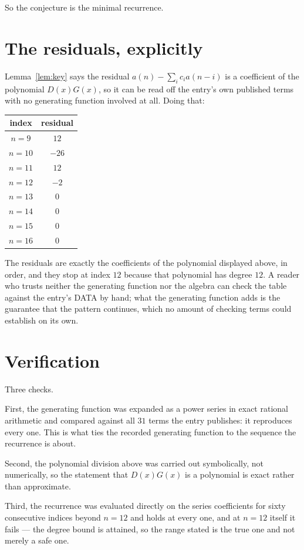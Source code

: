 \documentclass[11pt,a4paper]{article}
\theoremstyle{plain}
\theoremstyle{definition}
\begin{document}
So the conjecture is the minimal recurrence.

\section{The residuals, explicitly}

Lemma~\ref{lem:key} says the residual $a(n)-\sum_ic_ia(n-i)$ is a coefficient of the
polynomial $D(x)G(x)$, so it can be read off the entry's own published terms with no
generating function involved at all. Doing that:
\begin{center}
\begin{tabular}{cc}
index & residual \\ \hline
$n=9$ & $12$ \\
$n=10$ & $-26$ \\
$n=11$ & $12$ \\
$n=12$ & $-2$ \\
$n=13$ & $0$ \\
$n=14$ & $0$ \\
$n=15$ & $0$ \\
$n=16$ & $0$
\end{tabular}
\end{center}
The residuals are exactly the coefficients of the polynomial displayed above, in order, and
they stop at index $12$ because that polynomial has degree $12$. A reader who trusts
neither the generating function nor the algebra can check the table against the entry's DATA
by hand; what the generating function adds is the guarantee that the pattern continues, which
no amount of checking terms could establish on its own.

\section{Verification}

Three checks.

First, the generating function was expanded as a power series in exact rational arithmetic and
compared against all $31$ terms the entry publishes: it reproduces every one. This is
what ties the recorded generating function to the sequence the recurrence is about.

Second, the polynomial division above was carried out symbolically, not numerically, so the
statement that $D(x)G(x)$ is a polynomial is exact rather than approximate.

Third, the recurrence was evaluated directly on the series coefficients for sixty consecutive
indices beyond $n=12$ and holds at every one, and at $n=12$ itself it fails --- the
degree bound is attained, so the range stated is the true one and not merely a safe one.
\end{document}
